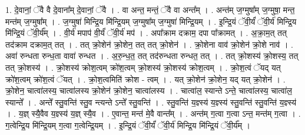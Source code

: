 \documentclass[17pt]{extarticle}
\begin{document}
1. दे॒वानां॒ ॅवै वै दे॒वाना᳚म् दे॒वानां॒ ॅवै । . वा अन्त॒ मन्तं॒ ॅवै वा अन्त᳚म् । . अन्त॑म् ज॒ग्मुषा᳚म् ज॒ग्मुषा॒ मन्त॒ मन्त॑म् ज॒ग्मुषा᳚म् । . ज॒ग्मुषा॑ मिन्द्रि॒य मि॑न्द्रि॒यम् ज॒ग्मुषा᳚म् ज॒ग्मुषा॑ मिन्द्रि॒यम् । . इ॒न्द्रि॒यं ॅवी॒र्यं॑ ॅवी॒र्य॑ मिन्द्रि॒य मि॑न्द्रि॒यं ॅवी॒र्य᳚म् । . वी॒र्य॑ मपाप॑ वी॒र्यं॑ ॅवी॒र्य॑ मप॑ । . अपा᳚क्राम दक्राम॒ दपा पा᳚क्रामत् । . अ॒क्रा॒म॒त् तत् तद॑क्राम दक्राम॒त् तत् । . तत् क्रो॒शेन॑ क्रो॒शेन॒ तत् तत् क्रो॒शेन॑ । . क्रो॒शेना वाव॑ क्रो॒शेन॑ क्रो॒शे नाव॑ । . अवा॑ रुन्धता रुन्ध॒ता वावा॑ रुन्धत । . अ॒रु॒न्ध॒त॒ तत् तद॑रुन्धता रुन्धत॒ तत् । . तत् क्रो॒शस्य॑ क्रो॒शस्य॒ तत् तत् क्रो॒शस्य॑ । . क्रो॒शस्य॑ क्रोश॒त्वम् क्रो॑श॒त्वम् क्रो॒शस्य॑ क्रो॒शस्य॑ क्रोश॒त्वम् । . क्रो॒श॒त्वं ॅयद् यत् क्रो॑श॒त्वम् क्रो॑श॒त्वं ॅयत् । . क्रो॒श॒त्वमिति॑ क्रोश - त्वम् । . यत् क्रो॒शेन॑ क्रो॒शेन॒ यद् यत् क्रो॒शेन॑ । . क्रो॒शेन॒ चात्वा॑लस्य॒ चात्वा॑लस्य क्रो॒शेन॑ क्रो॒शेन॒ चात्वा॑लस्य । . चात्वा॑ल॒ स्यान्ते ऽन्ते॒ चात्वा॑लस्य॒ चात्वा॑ल॒ स्यान्ते᳚ । . अन्ते᳚ स्तु॒वन्ति॑ स्तु॒व न्त्यन्ते ऽन्ते᳚ स्तु॒वन्ति॑ । . स्तु॒वन्ति॑ य॒ज्ञ्स्य॑ य॒ज्ञ्स्य॑ स्तु॒वन्ति॑ स्तु॒वन्ति॑ य॒ज्ञ्स्य॑ । . य॒ज्ञ् स्यै॒वैव य॒ज्ञ्स्य॑ य॒ज्ञ् स्यै॒व । . ए॒वान्त॒ मन्त॑ मे॒वै वान्त᳚म् । . अन्त॑म् ग॒त्वा ग॒त्वा ऽन्त॒ मन्त॑म् ग॒त्वा । . ग॒त्वेन्द्रि॒य मि॑न्द्रि॒यम् ग॒त्वा ग॒त्वेन्द्रि॒यम् । . इ॒न्द्रि॒यं ॅवी॒र्यं॑ ॅवी॒र्य॑ मिन्द्रि॒य मि॑न्द्रि॒यं ॅवी॒र्य᳚म् । \newline
\end{document}
